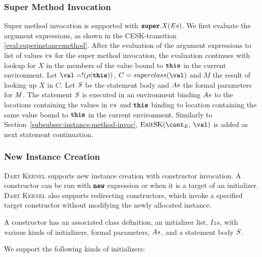 \documentclass[a4paper,oneside,fleqn]{article}
\newcommand{\kernel}{\textsc{Dart Kernel}}
\newcommand{\synt}[1]{\ensuremath{\text{\textbf{\texttt{#1}}}}}
\DeclareMathOperator{\new}{\synt{new}}
\newcommand{\this}{\synt{this}}
\newcommand{\idmeta}{\ensuremath{\mathit{X}}}
\begin{document}
\subsubsection{Super Method Invocation}
\label{subsubsec:super-method-invoc}

Super method invocation is supported with $\SuperMethodInvocation{\idmeta}{\expressionsmeta}$.
We first evaluate the argument expressions, as shown in the CESK-transition \eqref{eval:superinstancemethod}.
After the evaluation of the argument expressions to list of values $vs$ for the super method invocation, the evaluation continues with lookup for $\idmeta$ in the members of the value bound to $\this$ in the current environment.
Let $\val = \deref{(\env(\this))}$, $C = \superclass{\val}$ and $M$ the result of looking up $\idmeta$ in $C$.
Let $\mathit{S}$ be the statement body and $As$ the formal parameters for $\mathit{M}$.
The statement $\mathit{S}$ is executed in an environment binding $As$ to the locations containing the values in $vs$ and $\this$ binding to location containing the same value bound to $\this$ in the current environment.
Similarly to Section~\ref{subsubsec:instance-method-invoc}, $\ExitSK{\val}$ is added as next statement continuation.


\subsubsection{New Instance Creation}
\label{subsubsec:new-instance}

\kernel{} supports new instance creation with constructor invocation.
A constructor can be run with $\new$ expression or when it is a target of an initializer.
\kernel{} also supports redirecting constructors, which invoke a specified target constructor without modifying the newly allocated instance.

A constructor has an associated class definition, an initializer list, $Izs$, with various kinds of initializers, formal parameters, $As$, and a statement body $\mathit{S}$.

We support the following kinds of initializers:
\end{document}
